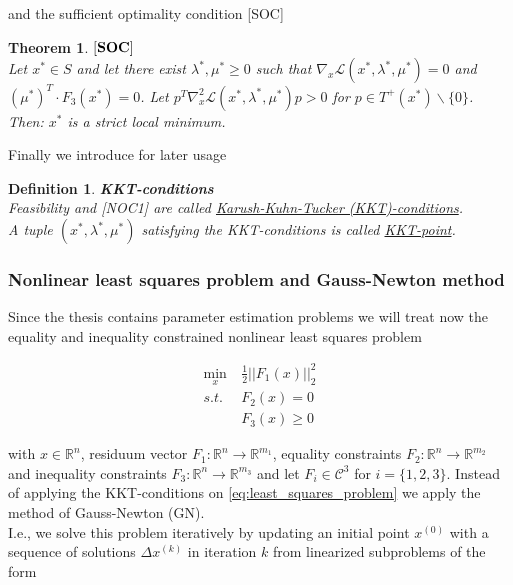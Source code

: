 \documentclass{scrartcl}[12pt, halfparskip]
\numberwithin{equation}{section}
\numberwithin{figure}{section}
\numberwithin{table}{section}
\newtheorem{Definition}{Definition}
\newtheorem{Theorem}{Theorem}
\begin{document}
and the sufficient optimality condition [SOC]

\begin{Theorem}
	$[\text{\textbf{SOC}}]$ \\
	Let $x^* \in S$ and let there exist $\lambda^*, \mu^* \ge 0$ such that $\nabla_x \mathcal{L}(x^*, \lambda^*, \mu^*) = 0$ and \\ $(\mu^*)^T \cdot F_3(x^*) = 0$. 
	Let $p^T \nabla_x^2 \mathcal{L}(x^*, \lambda^*, \mu^*) p > 0$ for $p \in T^+(x^*) \backslash \{0\}$. \\
	Then: $x^*$ is a strict local minimum.
\end{Theorem}

Finally we introduce for later usage 

\begin{Definition} \textbf{KKT-conditions} \\
	Feasibility and [NOC1] are called \underline{Karush-Kuhn-Tucker (KKT)-conditions}. \\
	A tuple $(x^*, \lambda^*, \mu^*)$ satisfying the KKT-conditions is called \underline{KKT-point}.
\end{Definition}


\subsubsection{Nonlinear least squares problem and Gauss-Newton method}
\label{sec:Gauss_Newton}
Since the thesis contains parameter estimation problems we will treat now the equality and inequality constrained nonlinear least squares problem

\begin{align}
	\min_x \ & \frac{1}{2}|| F_1(x) ||_2^2 \label{eq:least_squares_problem} \\
	s.t. \ & F_2(x) = 0 \nonumber \\
	& F_3(x) \ge 0 \nonumber
\end{align}

with $x \in \mathbb{R}^n$, residuum vector $F_1: \mathbb{R}^n \rightarrow \mathbb{R}^{m_1}$, equality constraints $F_2: \mathbb{R}^n \rightarrow \mathbb{R}^{m_2}$ and inequality constraints $F_3: \mathbb{R}^n \rightarrow \mathbb{R}^{m_3}$ and let $F_i \in \mathcal{C}^3$ for $i=\{1,2,3\}$.
Instead of applying the KKT-conditions on \cref{eq:least_squares_problem} we apply the method of Gauss-Newton (GN). \\
I.e., we solve this problem iteratively by updating an initial point $x^{(0)}$ with a sequence of solutions $\Delta x^{(k)}$ in iteration $k$ from linearized subproblems of the form
\end{document}
